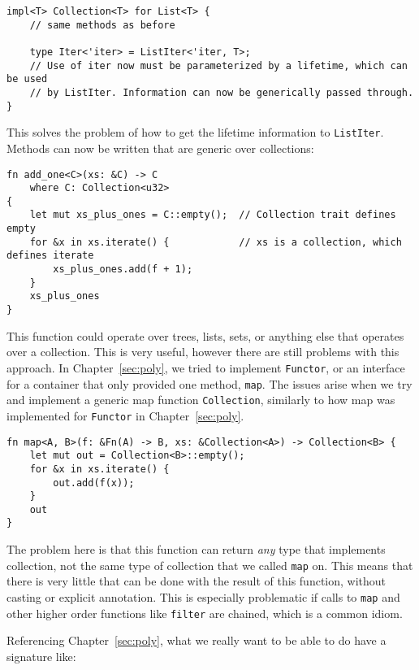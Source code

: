 \begin{lstlisting}[nolol]
impl<T> Collection<T> for List<T> {
    // same methods as before

    type Iter<'iter> = ListIter<'iter, T>;
    // Use of iter now must be parameterized by a lifetime, which can be used
    // by ListIter. Information can now be generically passed through.
}
\end{lstlisting}

This solves the problem of how to get the lifetime information to
\lstinline{ListIter}. Methods can now be written that are generic over
collections:

\begin{lstlisting}[nolol]
fn add_one<C>(xs: &C) -> C
    where C: Collection<u32>
{
    let mut xs_plus_ones = C::empty();  // Collection trait defines empty
    for &x in xs.iterate() {            // xs is a collection, which defines iterate
        xs_plus_ones.add(f + 1);
    }
    xs_plus_ones
}
\end{lstlisting}

This function could operate over trees, lists, sets, or anything else that
operates over a collection. This is very useful, however there are still
problems with this approach. In Chapter~\ref{sec:poly}, we tried to implement
\lstinline{Functor}, or an interface for a container that only provided one
method, \lstinline{map}.  The issues arise when we try and implement a generic
map function \lstinline{Collection}, similarly to how map was implemented for
\lstinline{Functor} in Chapter~\ref{sec:poly}.

\begin{lstlisting}[nolol]
fn map<A, B>(f: &Fn(A) -> B, xs: &Collection<A>) -> Collection<B> {
    let mut out = Collection<B>::empty();
    for &x in xs.iterate() {
        out.add(f(x));
    }
    out
}
\end{lstlisting}

The problem here is that this function can return \textit{any} type that
implements collection, not the same type of collection that we called
\lstinline{map} on. This means that there is very little that can be done with
the result of this function, without casting or explicit annotation. This is
especially problematic if calls to \lstinline{map} and other higher order
functions like \lstinline{filter} are chained, which is a common idiom.

Referencing Chapter~\ref{sec:poly}, what we really want to be able to do have a
signature like:

